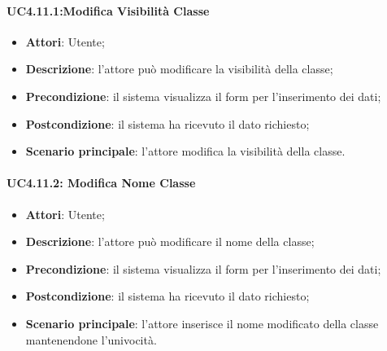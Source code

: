 \paragraph{UC4.11.1:Modifica Visibilità Classe}
\label{UC4.11.1} %
\begin{itemize}
\item \textbf{Attori}: Utente;
\item \textbf{Descrizione}: l'attore può modificare la visibilità della classe;	
\item \textbf{Precondizione}: il sistema visualizza il form per l'inserimento dei dati;	
\item \textbf{Postcondizione}: il sistema ha ricevuto il dato richiesto;
\item \textbf{Scenario principale}: l'attore modifica la visibilità della classe.
\end{itemize}

\paragraph{UC4.11.2: Modifica Nome Classe}
\label{UC4.11.2}
\begin{itemize}
\item \textbf{Attori}: Utente;
\item \textbf{Descrizione}: l'attore può modificare il nome della classe;
\item \textbf{Precondizione}: il sistema visualizza il form per l'inserimento dei dati;	
\item \textbf{Postcondizione}: il sistema ha ricevuto il dato richiesto;
\item \textbf{Scenario principale}:	l'attore inserisce il nome modificato della classe mantenendone l'univocità.
\end{itemize}

